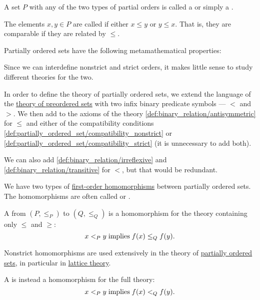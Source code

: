 \begin{definition}
  A set \( P \) with any of the two types of partial orders is called a  or simply a .

  The elements \( x, y \in P \) are called  if either \( x \leq y \) or \( y \leq x \). That is, they are comparable if they are related by \( \leq \).

  Partially ordered sets have the following metamathematical properties:
  \begin{thmenum}[resume=def:partially_ordered_set]
     Since we can interdefine nonstrict and strict orders, it makes little sense to study different theories for the two.

    In order to define the theory of partially ordered sets, we extend the language of the \hyperref[def:preordered_set/theory]{theory of preordered sets} with two infix binary predicate symbols --- \( < \) and \( > \). We then add to the axioms of the theory \eqref{def:binary_relation/antisymmetric} for \( \leq \) and either of the compatibility conditions \eqref{def:partially_ordered_set/compatibility_nonstrict} or \eqref{def:partially_ordered_set/compatibility_strict} (it is unnecessary to add both).

    We can also add \eqref{def:binary_relation/irreflexive} and \eqref{def:binary_relation/transitive} for \( < \), but that would be redundant.

     We have two types of \hyperref[def:first_order_homomorphism]{first-order homomorphisms} between partially ordered sets. The homomorphisms are often called  or .

    A  from \( (P, \leq_P) \) to \( (Q, \leq_Q) \) is a homomorphism for the theory containing only \( \leq \) and \( \geq \):
    \begin{equation}\label{eq:def:partially_ordered_set/homomorphism/nonstrict}
      x <_P y \T{implies} f(x) \leq_Q f(y).
    \end{equation}

    Nonstrict homomorphisms are used extensively in the theory of \hyperref[subsec:partially_ordered_sets]{partially ordered sets}, in particular in \hyperref[subsec:lattices]{lattice theory}.

    A  is instead a homomorphism for the full theory:
    \begin{equation}\label{eq:def:partially_ordered_set/homomorphism/strict}
      x <_P y \T{implies} f(x) <_Q f(y).
    \end{equation}


\end{thmenum}
\end{definition}
